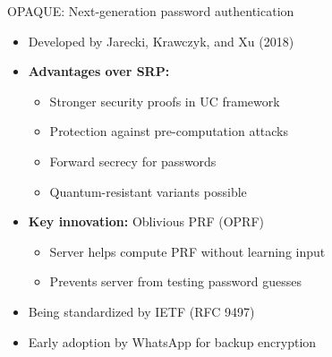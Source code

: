 \documentclass[aspectratio=169, lualatex, handout]{beamer}
\begin{document}
\begin{frame}{OPAQUE: Next-generation password authentication}
	\begin{itemize}
		\item Developed by Jarecki, Krawczyk, and Xu (2018)
		\item \textbf{Advantages over SRP:}
		      \begin{itemize}
			      \item Stronger security proofs in UC framework
			      \item Protection against pre-computation attacks
			      \item Forward secrecy for passwords
			      \item Quantum-resistant variants possible
		      \end{itemize}
		\item \textbf{Key innovation:} Oblivious PRF (OPRF)
		      \begin{itemize}
			      \item Server helps compute PRF without learning input
			      \item Prevents server from testing password guesses
		      \end{itemize}
		\item Being standardized by IETF (RFC 9497)
		\item Early adoption by WhatsApp for backup encryption
	\end{itemize}
\end{frame}
\end{document}
